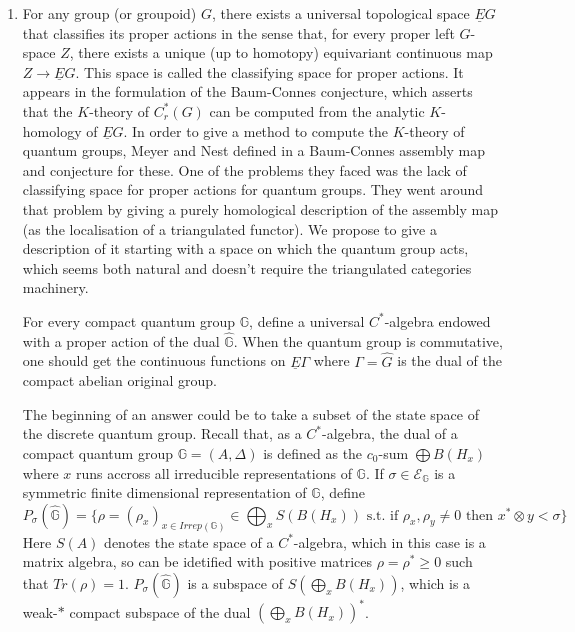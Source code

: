 \begin{enumerate}
\item For any group (or groupoid) $G$, there exists a universal topological space $\underline E G$ that classifies its proper actions in the sense that, for every proper left $G$-space $Z$, there exists a unique (up to homotopy) equivariant continuous map $Z \rightarrow \underline E G$. This space is called the classifying space for proper actions. It appears in the formulation of the Baum-Connes conjecture, which asserts that the $K$-theory of $C^*_r(G)$ can be computed from the analytic $K$-homology of $\underline E G$. In order to give a method to compute the $K$-theory of quantum groups, Meyer and Nest defined in \cite{MeyerNest} a Baum-Connes assembly map and conjecture for these. One of the problems they faced was the lack of classifying space for proper actions for quantum groups. They went around that problem by giving a purely homological description of the assembly map (as the localisation of a triangulated functor). We propose to give a description of it starting with a space on which the quantum group acts, which seems both natural and doesn't require the triangulated categories machinery.

\begin{project} For every compact quantum group $\mathbb G$, define a universal $C^*$-algebra endowed with a proper action of the dual 
$\hat {\mathbb G}$. When the quantum group is commutative, one should get the continuous functions on $\underline E \Gamma$ where $\Gamma= \hat G$ is the dual of the compact abelian original group.
\end{project}
The beginning of an answer could be to take a subset of the state space of the discrete quantum group. Recall that, as a $C^*$-algebra, the dual of a compact quantum group $\mathbb G = (A,\Delta)$ is defined as the $c_0$-sum $\bigoplus B(H_x)$ where $x$ runs accross all irreducible representations of $\mathbb G$. If $\sigma\in \mathcal E_{\mathbb G}$ is a symmetric finite dimensional representation of $\mathbb G$, define
\[P_\sigma(\hat{\mathbb G}) = \{ \rho = (\rho_x)_{x\in Irrep(\mathbb G)} \in \bigoplus_x S(B(H_x))\text{ s.t. if } \rho_x, \rho_y \neq 0 \text{ then } x^*\otimes y < \sigma\}\] 
Here $S(A)$ denotes the state space of a $C^*$-algebra, which in this case is a matrix algebra, so can be idetified with positive matrices $\rho=\rho^*\geq 0$ such that $Tr(\rho)=1$. $P_\sigma(\hat{\mathbb G})$ is a subspace of $S(\bigoplus_x B(H_x))$, which is a weak-$*$ compact subspace of the dual $(\bigoplus_x B(H_x))^*$.


\end{enumerate}
